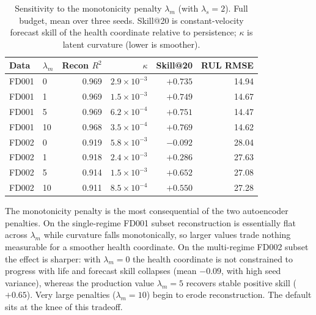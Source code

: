 \documentclass[a4paper,fleqn]{cas-sc}
\newcommand{\tinytable}{\scriptsize}
\newcommand{\verytighttables}{%
  \setlength{\tabcolsep}{3.5pt}%
  \renewcommand{\arraystretch}{1.05}%
}
\begin{document}
\begin{table}[t]
\centering
\caption{Sensitivity to the monotonicity penalty $\lambda_m$ (with
$\lambda_s{=}2$). Full budget, mean over three seeds. Skill@20 is
constant-velocity forecast skill of the health coordinate relative to
persistence; $\kappa$ is latent curvature (lower is smoother).}
\label{tab:sens-mono}
\tinytable
\verytighttables
\begin{tabular}{@{}llrrrr@{}}
\toprule
Data & $\lambda_m$ & Recon $R^2$ & $\kappa$ & Skill@20 & RUL RMSE \\
\midrule
FD001 & 0  & 0.969 & $2.9\!\times\!10^{-3}$ & $+0.735$ & 14.94 \\
FD001 & 1  & 0.969 & $1.5\!\times\!10^{-3}$ & $+0.749$ & 14.67 \\
FD001 & 5  & 0.969 & $6.2\!\times\!10^{-4}$ & $+0.751$ & 14.47 \\
FD001 & 10 & 0.968 & $3.5\!\times\!10^{-4}$ & $+0.769$ & 14.62 \\
FD002 & 0  & 0.919 & $5.8\!\times\!10^{-3}$ & $-0.092$ & 28.04 \\
FD002 & 1  & 0.918 & $2.4\!\times\!10^{-3}$ & $+0.286$ & 27.63 \\
FD002 & 5  & 0.914 & $1.5\!\times\!10^{-3}$ & $+0.652$ & 27.08 \\
FD002 & 10 & 0.911 & $8.5\!\times\!10^{-4}$ & $+0.550$ & 27.28 \\
\bottomrule
\end{tabular}
\end{table}

The monotonicity penalty is the most consequential of the two autoencoder
penalties. On the single-regime FD001 subset reconstruction is essentially
flat across $\lambda_m$ while curvature falls monotonically, so larger values
trade nothing measurable for a smoother health coordinate. On the multi-regime
FD002 subset the effect is sharper: with $\lambda_m{=}0$ the health coordinate
is not constrained to progress with life and forecast skill collapses (mean
$-0.09$, with high seed variance), whereas the production value $\lambda_m{=}5$
recovers stable positive skill ($+0.65$). Very large penalties ($\lambda_m{=}10$)
begin to erode reconstruction. The default sits at the knee of this tradeoff.
\end{document}
